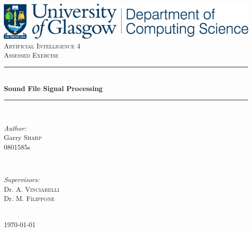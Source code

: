 \documentclass[12pt]{article} %
\begin{document}

\begin{titlepage}

\newcommand{\HRule}{\rule{\linewidth}{0.5mm}} %
\center %
\includegraphics[width=\textwidth]{Glasgow}\\[1.5cm]
\textsc{\LARGE Artificial Intelligence 4}\\[0.5cm] %
\textsc{\Large Assessed Exercise}\\[0.5cm] %

\HRule \\[0.4cm]
{ \huge \bfseries Sound File Signal Processing}\\[0.4cm] %
\HRule \\[1.5cm]

\begin{minipage}{0.4\textwidth}
\begin{flushleft} \large
\emph{Author:}\\
Garry \textsc{Sharp}\\
0801585s\\ %
\end{flushleft}
\end{minipage}
~
\begin{minipage}{0.4\textwidth}
\begin{flushright} \large
\emph{Supervisors:} \\
Dr. A. \textsc{Vinciarelli}\\ %
Dr. M. \textsc{Filippone}\\ %
\end{flushright}
\end{minipage}\\[4cm]

{\large \today}\\[3cm] %

\vfill %

\end{titlepage}
\end{document}
